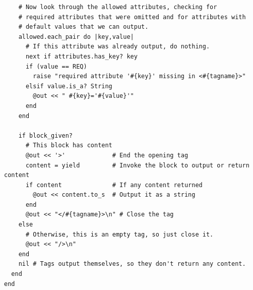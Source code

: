 \begin{latexonly}
\begin{lstlisting}
    # Now look through the allowed attributes, checking for 
    # required attributes that were omitted and for attributes with
    # default values that we can output.
    allowed.each_pair do |key,value|
      # If this attribute was already output, do nothing.
      next if attributes.has_key? key
      if (value == REQ)
        raise "required attribute '#{key}' missing in <#{tagname}>"
      elsif value.is_a? String
        @out << " #{key}='#{value}'"
      end
    end

    if block_given?
      # This block has content
      @out << '>'             # End the opening tag
      content = yield         # Invoke the block to output or return content
      if content              # If any content returned
        @out << content.to_s  # Output it as a string
      end
      @out << "</#{tagname}>\n" # Close the tag
    else 
      # Otherwise, this is an empty tag, so just close it.
      @out << "/>\n"
    end
    nil # Tags output themselves, so they don't return any content.
  end
end

    \end{lstlisting}
  \end{latexonly}
